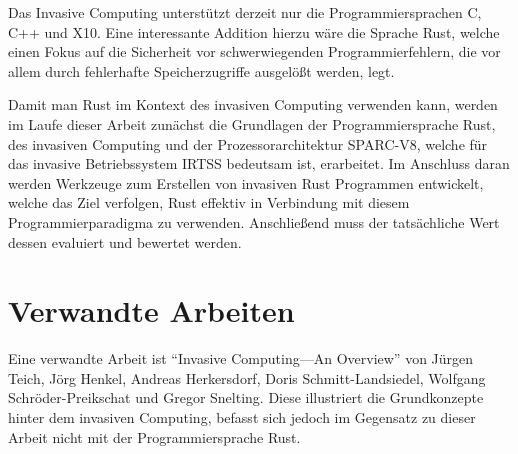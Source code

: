 Das Invasive Computing unterstützt derzeit nur die Programmiersprachen C, C++ und X10. Eine interessante Addition hierzu wäre
die Sprache Rust, welche einen Fokus auf die Sicherheit vor schwerwiegenden Programmierfehlern, die vor allem durch
fehlerhafte Speicherzugriffe ausgelößt werden, legt.

Damit man Rust im Kontext des invasiven Computing verwenden kann, werden im Laufe dieser Arbeit zunächst die Grundlagen der
Programmiersprache Rust, des invasiven Computing und der Prozessorarchitektur SPARC-V8, welche für das
invasive Betriebssystem IRTSS bedeutsam ist, erarbeitet. Im Anschluss daran werden Werkzeuge zum Erstellen von invasiven
Rust Programmen entwickelt, welche das Ziel verfolgen, Rust effektiv in Verbindung mit diesem Programmierparadigma zu verwenden.
Anschließend muss der tatsächliche Wert dessen evaluiert und bewertet werden.

\section{Verwandte Arbeiten}

Eine verwandte Arbeit ist "`Invasive Computing—An Overview"'\cite{teich11msoc} von Jürgen Teich, Jörg Henkel, Andreas Herkersdorf,
Doris Schmitt-Landsiedel, Wolfgang Schröder-Preikschat und Gregor Snelting.
Diese illustriert die Grundkonzepte hinter dem invasiven Computing, befasst sich jedoch im Gegensatz zu dieser Arbeit nicht mit der
Programmiersprache Rust.
